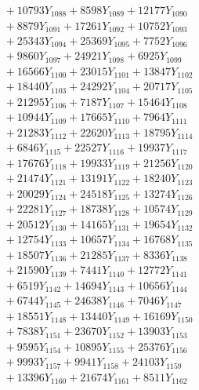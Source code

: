 \documentclass[a4paper,10pt]{article}
\begin{document}
{\begin{align}
&\;  + 10793 Y_{1088} + 8598 Y_{1089} + 12177 Y_{1090} \\[0.3ex]
&\;  + 8879 Y_{1091} + 17261 Y_{1092} + 10752 Y_{1093} \\[0.3ex]
&\;  + 25343 Y_{1094} + 25369 Y_{1095} + 7752 Y_{1096} \\[0.3ex]
&\;  + 9860 Y_{1097} + 24921 Y_{1098} + 6925 Y_{1099} \\[0.3ex]
&\;  + 16566 Y_{1100} + 23015 Y_{1101} + 13847 Y_{1102} \\[0.3ex]
&\;  + 18440 Y_{1103} + 24292 Y_{1104} + 20717 Y_{1105} \\[0.3ex]
&\;  + 21295 Y_{1106} + 7187 Y_{1107} + 15464 Y_{1108} \\[0.5ex]\allowbreak
&\;  + 10944 Y_{1109} + 17665 Y_{1110} + 7964 Y_{1111} \\[0.3ex]
&\;  + 21283 Y_{1112} + 22620 Y_{1113} + 18795 Y_{1114} \\[0.3ex]
&\;  + 6846 Y_{1115} + 22527 Y_{1116} + 19937 Y_{1117} \\[0.3ex]
&\;  + 17676 Y_{1118} + 19933 Y_{1119} + 21256 Y_{1120} \\[0.3ex]
&\;  + 21474 Y_{1121} + 13191 Y_{1122} + 18240 Y_{1123} \\[0.3ex]
&\;  + 20029 Y_{1124} + 24518 Y_{1125} + 13274 Y_{1126} \\[0.3ex]
&\;  + 22281 Y_{1127} + 18738 Y_{1128} + 10574 Y_{1129} \\[0.3ex]
&\;  + 20512 Y_{1130} + 14165 Y_{1131} + 19654 Y_{1132} \\[0.3ex]
&\;  + 12754 Y_{1133} + 10657 Y_{1134} + 16768 Y_{1135} \\[0.3ex]
&\;  + 18507 Y_{1136} + 21285 Y_{1137} + 8336 Y_{1138} \\[0.5ex]\allowbreak
&\;  + 21590 Y_{1139} + 7441 Y_{1140} + 12772 Y_{1141} \\[0.3ex]
&\;  + 6519 Y_{1142} + 14694 Y_{1143} + 10656 Y_{1144} \\[0.3ex]
&\;  + 6744 Y_{1145} + 24638 Y_{1146} + 7046 Y_{1147} \\[0.3ex]
&\;  + 18551 Y_{1148} + 13440 Y_{1149} + 16169 Y_{1150} \\[0.3ex]
&\;  + 7838 Y_{1151} + 23670 Y_{1152} + 13903 Y_{1153} \\[0.3ex]
&\;  + 9595 Y_{1154} + 10895 Y_{1155} + 25376 Y_{1156} \\[0.3ex]
&\;  + 9993 Y_{1157} + 9941 Y_{1158} + 24103 Y_{1159} \\[0.3ex]
&\;  + 13396 Y_{1160} + 21674 Y_{1161} + 8511 Y_{1162} \\[0.3ex]

\end{align}}
\end{document}
